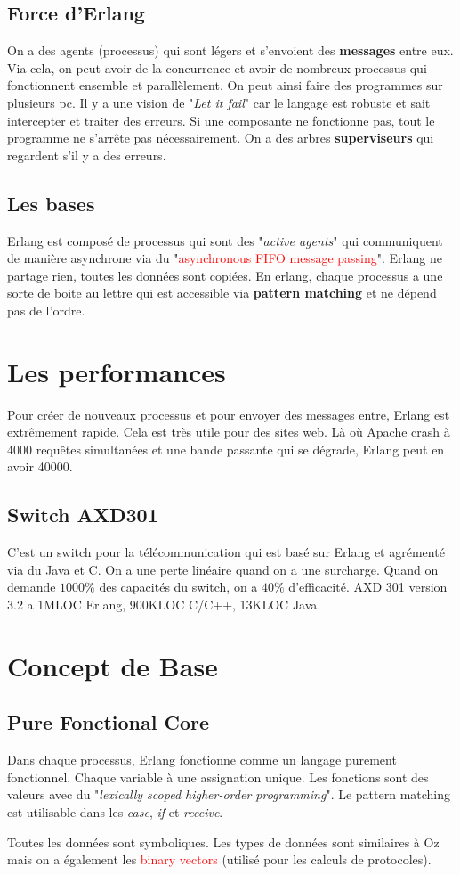 \documentclass{report}
\begin{document}
\subsection{Force d'Erlang}
On a des agents (processus) qui sont légers et s'envoient des \textbf{messages} entre eux. Via cela, on peut avoir de la concurrence et avoir de nombreux processus qui fonctionnent ensemble et parallèlement. On peut ainsi faire des programmes sur plusieurs pc. Il y a une vision de "\textit{Let it fail}" car le langage est robuste et sait intercepter et traiter des erreurs. Si une composante ne fonctionne pas, tout le programme ne s'arrête pas nécessairement. On a des arbres \textbf{superviseurs} qui regardent s'il y a des erreurs.

\subsection{Les bases}
Erlang est composé de processus qui sont des "\textit{active agents}" qui communiquent de manière asynchrone via du "\textcolor{red}{asynchronous FIFO message passing}". Erlang ne partage rien, toutes les données sont copiées. En erlang, chaque processus a une sorte de boite au lettre qui est accessible via \textbf{pattern matching} et ne dépend pas de l'ordre.

\section{Les performances}
Pour créer de nouveaux processus et pour envoyer des messages entre, Erlang est extrêmement rapide. Cela est très utile pour des sites web. Là où Apache crash à 4000 requêtes simultanées et une bande passante qui se dégrade, Erlang peut en avoir 40000.
\subsection{Switch AXD301}
C'est un switch pour la télécommunication qui est basé sur Erlang et agrémenté via du Java et C. On a une perte linéaire quand on a une surcharge. Quand on demande $1000\%$ des capacités du switch, on a $40\%$ d'efficacité. AXD 301 version 3.2 a 1MLOC Erlang, 900KLOC C/C++, 13KLOC Java.

\section{Concept de Base}
\subsection{Pure Fonctional Core}
Dans chaque processus, Erlang fonctionne comme un langage purement fonctionnel. Chaque variable à une assignation unique. Les fonctions sont des valeurs avec du "\textit{lexically scoped higher-order programming}". Le pattern matching est utilisable dans les \textit{case}, \textit{if} et \textit{receive}.\par 
Toutes les données sont symboliques. Les types de données sont similaires à Oz mais on a également les \textcolor{red}{binary vectors} (utilisé pour les calculs de protocoles). 
\end{document}
